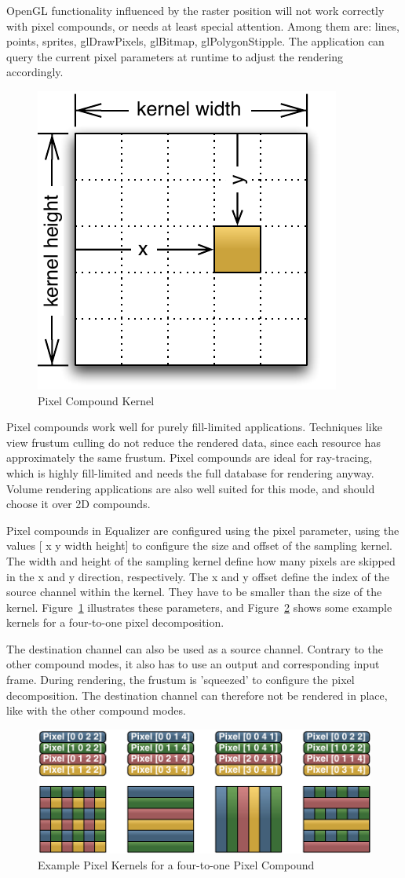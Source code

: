 \documentclass[10pt,a4]{scrartcl}
\newcommand{\fig}[1]{Figure~\ref{#1}}
\begin{document}
OpenGL functionality influenced by the raster position will not work
correctly with pixel compounds, or needs at least special
attention. Among them are: lines, points, sprites, glDrawPixels,
glBitmap, glPolygonStipple. The application can query the current pixel
parameters at runtime to adjust the rendering accordingly.

\begin{figure}
  \includegraphics[width=.382\textwidth]{images/pixelKernel.pdf}
  {\caption{\label{fPixelKernel}\small Pixel Compound Kernel}}
\end{figure}
Pixel compounds work well for purely fill-limited applications. Techniques like
view frustum culling do not reduce the rendered data, since each resource has
approximately the same frustum. Pixel compounds are ideal for ray-tracing, which
is highly fill-limited and needs the full database for rendering anyway. Volume
rendering applications are also well suited for this mode, and should choose it
over 2D compounds.

Pixel compounds in Equalizer are configured using the \textsf{pixel}
parameter, using the values \textsf{[ x y width height]}  to configure
the size and offset of the sampling kernel. The width and height of the
sampling kernel define how many pixels are skipped in the x and y
direction, respectively. The x and y offset define the index of the
source channel within the kernel. They have to be smaller than the size
of the kernel. \fig{fPixelKernel} illustrates these parameters, and
\fig{fPixelKernels} shows some example kernels for a four-to-one pixel decomposition.

The destination channel can also be used as a source channel. Contrary
to the other compound modes, it also has to use an output and
corresponding input frame. During rendering, the frustum is 'squeezed'
to configure the pixel decomposition. The destination channel can
therefore not be rendered in place, like with the other compound modes.
\begin{figure}[ht!]\center
  \includegraphics[width=.9\textwidth]{images/pixelKernels.pdf}
  {\caption{\label{fPixelKernels}Example Pixel Kernels for a
      four-to-one Pixel Compound}}
\end{figure}
\end{document}
